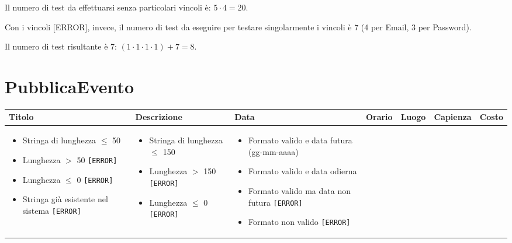 \noindent Il numero di test da effettuarsi senza particolari vincoli è: $5 \cdot 4 = 20$.

\noindent Con i vincoli [ERROR], invece, il numero di test da eseguire per testare singolarmente i vincoli è 7 (4 per Email, 3 per Password).

\noindent Il numero di test risultante è 7: $(1 \cdot 1 \cdot 1 \cdot 1) + 7 = 8$.


\section{PubblicaEvento}
\begin{table}[H]
	\centering
	\footnotesize
	\renewcommand{\arraystretch}{1.3}
	\begin{tabularx}{\textwidth}{|X|X|X|X|X|X|X|}
		\hline
		\textbf{Titolo} & \textbf{Descrizione} & \textbf{Data} & \textbf{Orario} & \textbf{Luogo} & \textbf{Capienza} & \textbf{Costo} \\
		\hline

		\parbox[t]{\linewidth}{\begin{itemize}[leftmargin=*]
			\item Stringa di lunghezza $\leq$ 50 \checkmark
			\item Lunghezza $>$ 50 \texttt{[ERROR]}
			\item Lunghezza $\leq$ 0 \texttt{[ERROR]}
			\item Stringa già esistente nel sistema \texttt{[ERROR]}
		\end{itemize}} &

		\parbox[t]{\linewidth}{\begin{itemize}[leftmargin=*]
			\item Stringa di lunghezza $\leq$ 150 \checkmark
			\item Lunghezza $>$ 150 \texttt{[ERROR]}
			\item Lunghezza $\leq$ 0 \texttt{[ERROR]}
		\end{itemize}} &

		\parbox[t]{\linewidth}{\begin{itemize}[leftmargin=*]
			\item Formato valido e data futura (gg-mm-aaaa) \checkmark
			\item Formato valido e data odierna \checkmark
			\item Formato valido ma data non futura \texttt{[ERROR]}
			\item Formato non valido \texttt{[ERROR]}
		\end{itemize}} &


\end{tabularx}
\end{table}
